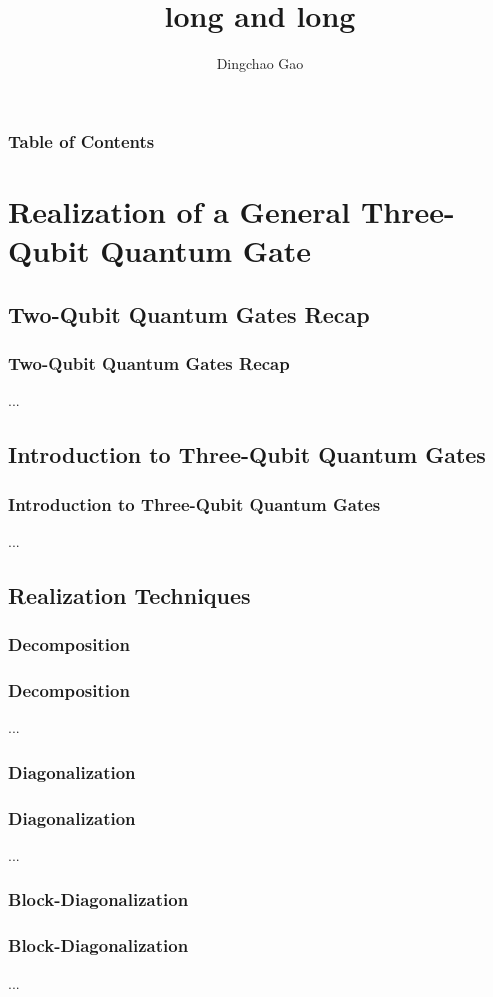 \documentclass[aspectratio=1610]{beamer}
\title[]{long and long}
\author[Gcc]{Dingchao Gao}
\institute[ISCAS]{Institute of Software Chinese Academy of Sciences}
\begin{document}
\frame{\titlepage}

\begin{frame}
\frametitle{Table of Contents}
\tableofcontents[hideallsubsections]
\end{frame}


\section{Realization of a General Three-Qubit Quantum Gate}
\subsection{Two-Qubit Quantum Gates Recap}
\begin{frame}
\frametitle{Two-Qubit Quantum Gates Recap}
...
\end{frame}

\subsection{Introduction to Three-Qubit Quantum Gates}
\begin{frame}
\frametitle{Introduction to Three-Qubit Quantum Gates}
...
\end{frame}

\subsection{Realization Techniques}
\subsubsection{Decomposition}
\begin{frame}
\frametitle{Decomposition}
...
\end{frame}

\subsubsection{Diagonalization}
\begin{frame}
\frametitle{Diagonalization}
...
\end{frame}

\subsubsection{Block-Diagonalization}
\begin{frame}
\frametitle{Block-Diagonalization}
...
\end{frame}
\end{document}
